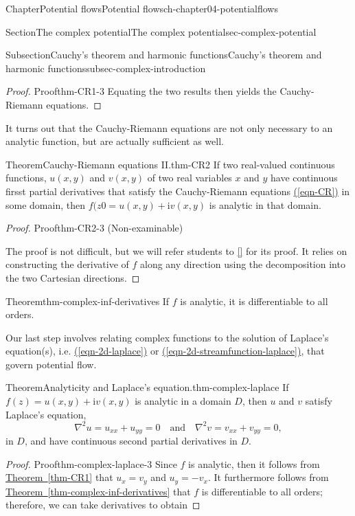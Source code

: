 \documentclass[oneside,10pt,]{book}
\newcommand{\xreffont}{\relax}
\numberwithin{equation}{section}
\newcommand{\im}{\mathrm{i}}
\begin{document}
\begin{chapterptx}{Chapter}{Potential flows}{}{Potential flows}{}{}{ch-chapter04-potentialflows}
\begin{sectionptx}{Section}{The complex potential}{}{The complex potential}{}{}{sec-complex-potential}
\begin{subsectionptx}{Subsection}{Cauchy's theorem and harmonic functions}{}{Cauchy's theorem and harmonic functions}{}{}{subsec-complex-introduction}
\begin{proof}{Proof}{}{thm-CR1-3}
Equating the two results then yields the Cauchy-Riemann equations.%
\end{proof}
It turns out that the Cauchy-Riemann equations are not only necessary to an analytic function, but are actually sufficient as well.%
\begin{theorem}{Theorem}{Cauchy-Riemann equations II.}{}{thm-CR2}%
If two real-valued continuous functions, \(u(x, y)\) and \(v(x, y)\) of two real variables \(x\) and \(y\) have continuous firsst partial derivatives that satisfy the Cauchy-Riemann equations \hyperref[eqn-CR]{({\xreffont\ref{eqn-CR}})} in some domain, then \(f(z0 = u(x, y) + \im v(x, y)\) is analytic in that domain.%
\end{theorem}
\begin{proof}{Proof}{}{thm-CR2-3}
(Non-examinable)%
\par
The proof is not difficult, but we will refer students to \hyperlink{ref-kreyszig}{[{\xreffont 2}]} for its proof. It relies on constructing the derivative of \(f\) along any direction using the decomposition into the two Cartesian directions.%
\end{proof}
\begin{theorem}{Theorem}{}{}{thm-complex-inf-derivatives}%
If \(f\) is analytic, it is differentiable to all orders.%
\end{theorem}
Our last step involves relating complex functions to the solution of Laplace's equation(s), i.e. \hyperref[eqn-2d-laplace]{({\xreffont\ref{eqn-2d-laplace}})} or \hyperref[eqn-2d-streamfunction-laplace]{({\xreffont\ref{eqn-2d-streamfunction-laplace}})}, that govern potential flow.%
\begin{theorem}{Theorem}{Analyticity and Laplace's equation.}{}{thm-complex-laplace}%
If \(f(z) = u(x, y) + \im v(x, y)\) is analytic in a domain \(D\), then \(u\) and \(v\) satisfy Laplace's equation,%
\begin{equation*}
\nabla^2 u = u_{xx} + u_{yy} = 0 \quad \textrm{and} \quad
\nabla^2 v = v_{xx} + v_{yy} = 0,
\end{equation*}
in \(D\), and have continuous second partial derivatives in \(D\).%
\end{theorem}
\begin{proof}{Proof}{}{thm-complex-laplace-3}
Since \(f\) is analytic, then it follows from \hyperref[thm-CR1]{Theorem~{\xreffont\ref{thm-CR1}}} that \(u_x = v_y\) and \(u_y = -v_x\). It furthermore follows from \hyperref[thm-complex-inf-derivatives]{Theorem~{\xreffont\ref{thm-complex-inf-derivatives}}} that \(f\) is differentiable to all orders; therefore, we can take derivatives to obtain%

\end{proof}
\end{subsectionptx}
\end{sectionptx}
\end{chapterptx}
\end{document}
